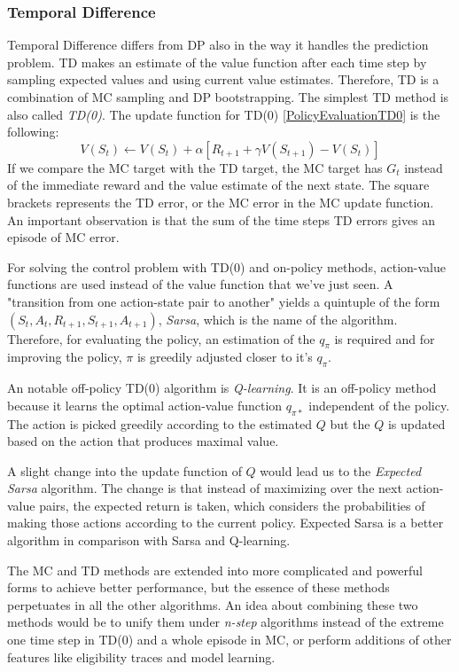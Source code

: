 \subsubsection{Temporal Difference}\label{Temporal Difference}
Temporal Difference differs from DP also in the way it handles the prediction problem. TD makes an estimate of the value function after each time step by sampling expected values and using current value estimates. Therefore, TD is a combination of MC sampling and DP bootstrapping. The simplest TD method is also called \textit{TD(0)}. The update function for TD(0) \ref{PolicyEvaluationTD0} is the following:
\begin{equation}\label{PolicyEvaluationTD0}
V(S_{t})\leftarrow V(S_{t})+\alpha \left [ R_{t+1}+\gamma V(S_{t+1})-V(S_{t}) \right ]
\end{equation}
If we compare the MC target with the TD target, the MC target has $G_{t}$ instead of the immediate reward and the value estimate of the next state. The square brackets represents the TD error, or the MC error in the MC update function. An important observation is that the sum of the time steps TD errors gives an episode of MC error.

For solving the control problem with TD(0) and on-policy methods, action-value functions are used instead of the value function that we've just seen. A "transition from one action-state pair to another" \cite{Sutton} yields a quintuple of the form $(S_{t}, A_{t}, R_{t+1}, S_{t+1}, A_{t+1})$, \textit{Sarsa}, which is the name of the algorithm. Therefore, for evaluating the policy, an estimation of the $q_{\pi}$ is required and for improving the policy, $\pi$ is greedily adjusted closer to it's $q_{\pi}$.

An notable off-policy TD(0) algorithm is \textit{Q-learning}. It is an off-policy method because it learns the optimal action-value function $q_{\pi*}$ independent of the policy. The action is picked greedily according to the estimated $Q$ but the $Q$ is updated based on the action that produces maximal value. 

A slight change into the update function of $Q$ would lead us to the \textit{Expected Sarsa} algorithm. The change is that instead of maximizing over the next action-value pairs, the expected return is taken, which considers the probabilities of making those actions according to the current policy. Expected Sarsa is a better algorithm in comparison with Sarsa and Q-learning.

The MC and TD methods are extended into more complicated and powerful forms to achieve better performance, but the essence of these methods perpetuates in all the other algorithms. An idea about combining these two methods would be to unify them under \textit{n-step} algorithms instead of the extreme one time step in TD(0) and a whole episode in MC, or perform additions of other features like eligibility traces and model learning.
	
